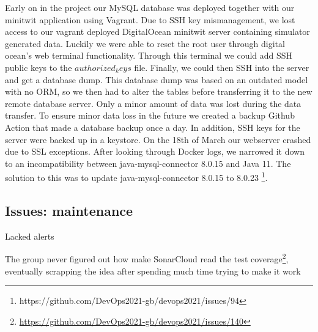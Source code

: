 Early on in the project our MySQL database was deployed together with our minitwit application using Vagrant. Due to SSH key mismanagement, we lost access to our vagrant deployed DigitalOcean minitwit server containing simulator generated data. Luckily we were able to reset the root user through digital ocean's web terminal functionality. Through this terminal we could add SSH public keys to the $authorized_keys$ file. Finally, we could then SSH into the server and get a database dump. This database dump was based on an outdated model with no ORM, so we then had to alter the tables before transferring it to the new remote database server. Only a minor amount of data was lost during the data transfer. To ensure minor data loss in the future we created a backup Github Action that made a database backup once a day. In addition, SSH keys for the server were backed up in a keystore.
On the 18th of March our webserver crashed due to SSL exceptions. After looking through Docker logs, we narrowed it down to an incompatibility between java-mysql-connector 8.0.15 and Java 11. The solution to this was to update java-mysql-connector 8.0.15 to 8.0.23 \footnote{https://github.com/DevOps2021-gb/devops2021/issues/94}.

\subsection{Issues: maintenance}
Lacked alerts

The group never figured out how make SonarCloud read the test coverage\footnote{\url{https://github.com/DevOps2021-gb/devops2021/issues/140}}, eventually scrapping the idea after spending much time trying to make it work